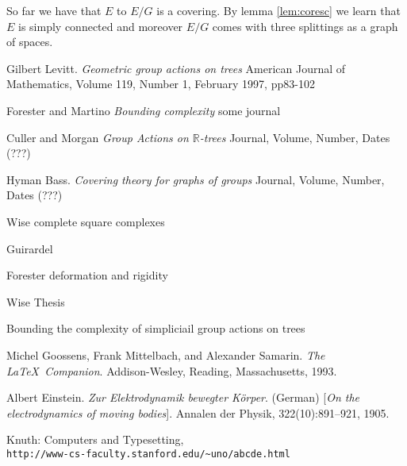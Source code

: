 \documentclass[12pt,parskip=full]{report}
\theoremstyle{plain}
\theoremstyle{definition}
\begin{document}
So far we have that $E$ to $E/G$ is a covering. By lemma \ref{lem:coresc} we learn that \(E\) is simply connected and moreover \(E/G\) comes with three splittings as a graph of spaces.



\noindent

\cleardoublepage








\begin{thebibliography}{9}


Gilbert Levitt.
\textit{Geometric group actions on trees}
American Journal of Mathematics, Volume 119, Number 1, February 1997, pp83-102

Forester and Martino
\textit{Bounding complexity}
some journal

Culler and Morgan
\textit{Group Actions on $\mathbb{R}$-trees}
Journal, Volume, Number, Dates (???)

Hyman Bass.
\textit{Covering theory for graphs of groups}
Journal, Volume, Number, Dates (???)


Wise complete square complexes

Guirardel

Forester deformation and rigidity

Wise Thesis

Bounding the complexity of simpliciail group actions
on trees 


Michel Goossens, Frank Mittelbach, and Alexander Samarin. 
\textit{The \LaTeX\ Companion}. 
Addison-Wesley, Reading, Massachusetts, 1993.

Albert Einstein. 
\textit{Zur Elektrodynamik bewegter K{\"o}rper}. (German) 
[\textit{On the electrodynamics of moving bodies}]. 
Annalen der Physik, 322(10):891–921, 1905.

Knuth: Computers and Typesetting,
\\\texttt{http://www-cs-faculty.stanford.edu/\~{}uno/abcde.html}

\end{thebibliography}



\end{document}
